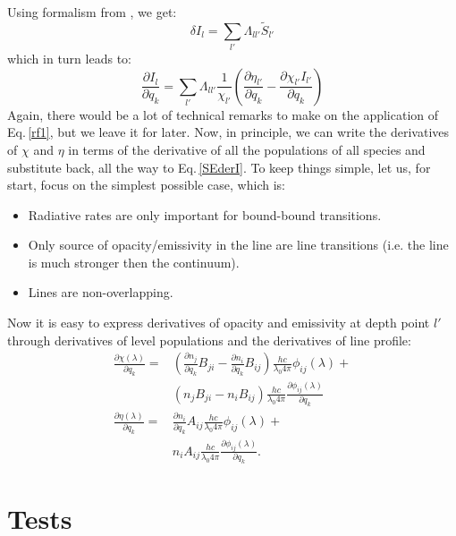 \documentclass[referee]{aa}
\begin{document}
Using formalism from \citet{dtibook}, we get:
\begin{equation}
\delta I_l = \sum_{l'} \Lambda_{ll'} \tilde{S}_{l'}
\end{equation}
which in turn leads to:
\begin{equation}
\frac{\partial I_l}{\partial q_k} = \sum_{l'} \Lambda_{ll'} \frac{1}{\chi_{l'}} \left ( \frac{\partial \eta_{l'}}{\partial q_k} - \frac{\partial \chi_{l'} I_{l'}}{\partial q_k} \right )
\label{rf1}
\end{equation}
Again, there would be a lot of technical remarks to make on the application of Eq.\,\ref{rf1}, but we leave it for later. Now, in principle, we can write the derivatives of $\chi$ and $\eta$ in terms of the derivative of all the populations of all species and substitute back, all the way to Eq.\,\ref{SEderI}. To keep things simple, let us, for start, focus on the simplest possible case, which is:
\begin{itemize}
 \item Radiative rates are only important for bound-bound transitions.
 \item Only source of opacity/emissivity in the line are line transitions (i.e. the line is much stronger then the continuum).
 \item Lines are non-overlapping.
\end{itemize}
Now it is easy to express derivatives of opacity and emissivity at depth point $l'$ through derivatives of level populations and the derivatives of line profile:
\begin{align}
  \frac{\partial \chi(\lambda)}{\partial q_k} = & \left (\frac{\partial n_j}{\partial q_k}B_{ji} - \frac{\partial n_i}{\partial q_k} B_{ij} \right) \frac{hc}{\lambda_0 4\pi} \phi_{ij}(\lambda) + \nonumber \\
 & \left(n_j B_{ji} - n_i B_{ij} \right) \frac{hc}{\lambda_0 4\pi} \frac{\partial\phi_{ij}(\lambda)}{\partial q_k}  \nonumber \\
  \frac{\partial \eta(\lambda)}{\partial q_k} = & \frac{\partial n_i}{\partial q_k} A_{ij}\frac{hc}{\lambda_0 4\pi} \phi_{ij}(\lambda) \nonumber + \\
 & n_i A_{ij} \frac{hc}{\lambda_0 4\pi} \frac{\partial\phi_{ij}(\lambda)}{\partial q_k}.
\end{align}




\section{Tests}
\end{document}
